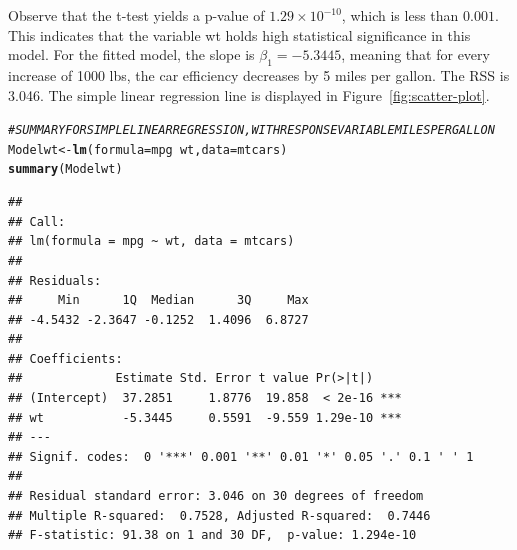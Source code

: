 \documentclass{article}\usepackage[]{graphicx}\usepackage[]{xcolor}
\makeatletter
\newcommand{\hlcom}[1]{\textcolor[rgb]{0.678,0.584,0.686}{\textit{#1}}}%
\newcommand{\hlopt}[1]{\textcolor[rgb]{0,0,0}{#1}}%
\newcommand{\hlstd}[1]{\textcolor[rgb]{0.345,0.345,0.345}{#1}}%
\newcommand{\hlkwb}[1]{\textcolor[rgb]{0.69,0.353,0.396}{#1}}%
\newcommand{\hlkwc}[1]{\textcolor[rgb]{0.333,0.667,0.333}{#1}}%
\newcommand{\hlkwd}[1]{\textcolor[rgb]{0.737,0.353,0.396}{\textbf{#1}}}%
\newenvironment{kframe}{%
 \def\at@end@of@kframe{}%
 \ifinner\ifhmode%
  \def\at@end@of@kframe{\end{minipage}}%
  \begin{minipage}{\columnwidth}%
 \fi\fi%
 \def\FrameCommand##1{\hskip\@totalleftmargin \hskip-\fboxsep
 \colorbox{shadecolor}{##1}\hskip-\fboxsep
     \hskip-\linewidth \hskip-\@totalleftmargin \hskip\columnwidth}%
 \MakeFramed {\advance\hsize-\width
   \@totalleftmargin\z@ \linewidth\hsize
   \@setminipage}}%
 {\par\unskip\endMakeFramed%
 \at@end@of@kframe}
\newenvironment{knitrout}{}{} %
\numberwithin{equation}{section}
\makeatother
\begin{document}
\noindent
Observe that the t-test yields a p-value of $1.29 \times 10^{-10}$, which is less than $0.001$. This indicates that the variable wt holds high statistical significance in this model. For the fitted model, the slope is $\beta_1 = -5.3445$, meaning that for every increase of 1000 lbs, the car efficiency decreases by 5 miles per gallon. The RSS is 3.046. The simple linear regression line is displayed in Figure~\ref{fig:scatter-plot}.

\begin{knitrout}\scriptsize
{}\color{fgcolor}\begin{kframe}
\begin{alltt}
\hlcom{# SUMMARY FOR SIMPLE LINEAR REGRESSION, WITH RESPONSE VARIABLE MILES PER GALLON}
\hlstd{Modelwt} \hlkwb{<-} \hlkwd{lm}\hlstd{(}\hlkwc{formula} \hlstd{= mpg} \hlopt{~} \hlstd{wt,} \hlkwc{data} \hlstd{= mtcars)}
\hlkwd{summary}\hlstd{(Modelwt)}
\end{alltt}
\begin{verbatim}
## 
## Call:
## lm(formula = mpg ~ wt, data = mtcars)
## 
## Residuals:
##     Min      1Q  Median      3Q     Max 
## -4.5432 -2.3647 -0.1252  1.4096  6.8727 
## 
## Coefficients:
##             Estimate Std. Error t value Pr(>|t|)    
## (Intercept)  37.2851     1.8776  19.858  < 2e-16 ***
## wt           -5.3445     0.5591  -9.559 1.29e-10 ***
## ---
## Signif. codes:  0 '***' 0.001 '**' 0.01 '*' 0.05 '.' 0.1 ' ' 1
## 
## Residual standard error: 3.046 on 30 degrees of freedom
## Multiple R-squared:  0.7528,	Adjusted R-squared:  0.7446 
## F-statistic: 91.38 on 1 and 30 DF,  p-value: 1.294e-10
\end{verbatim}
\end{kframe}
\end{knitrout}
\end{document}
